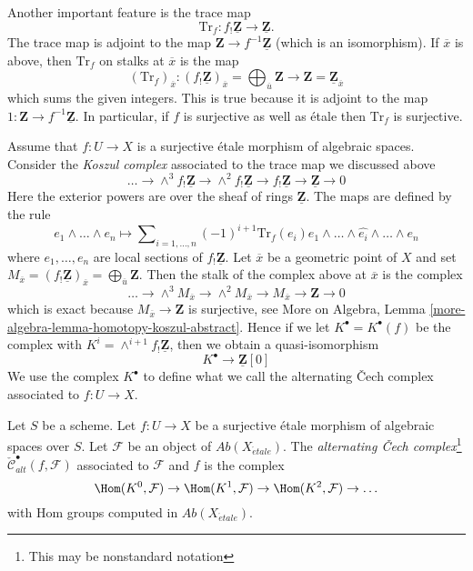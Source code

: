 \noindent
Another important feature is the trace map
$$
\text{Tr}_f : f_!\underline{\mathbf{Z}} \longrightarrow \underline{\mathbf{Z}}.
$$
The trace map is adjoint to the
map $\mathbf{Z} \to f^{-1}\underline{\mathbf{Z}}$ (which is an isomorphism).
If $\overline{x}$ is above, then $\text{Tr}_f$ on stalks at $\overline{x}$
is the map
$$
(\text{Tr}_f)_{\overline{x}} :
(f_!\underline{\mathbf{Z}})_{\overline{x}} =
\bigoplus\nolimits_{\overline{u}} \mathbf{Z}
\longrightarrow
\mathbf{Z} = \underline{\mathbf{Z}}_{\overline{x}}
$$
which sums the given integers. This is true because it is adjoint to the map
$1 : \mathbf{Z} \to f^{-1}\underline{\mathbf{Z}}$. In particular, if
$f$ is surjective as well as \'etale then $\text{Tr}_f$ is surjective.

\medskip\noindent
Assume that $f : U \to X$ is a surjective \'etale
morphism of algebraic spaces. Consider the {\it Koszul complex}
associated to the trace map we discussed above
$$
\ldots \to \wedge^3f_!\underline{\mathbf{Z}} \to
\wedge^2f_!\underline{\mathbf{Z}} \to f_!\underline{\mathbf{Z}} \to
\underline{\mathbf{Z}} \to 0
$$
Here the exterior powers are over the sheaf of rings $\underline{\mathbf{Z}}$.
The maps are defined by the rule
$$
e_1 \wedge \ldots \wedge e_n \longmapsto
\sum\nolimits_{i = 1, \ldots, n} (-1)^{i + 1}
\text{Tr}_f(e_i)
e_1 \wedge \ldots \wedge \widehat{e_i} \wedge \ldots \wedge e_n
$$
where $e_1, \ldots, e_n$ are local sections of $f_!\underline{\mathbf{Z}}$.
Let $\overline{x}$ be a geometric point of $X$ and set
$M_{\overline{x}} = (f_!\underline{\mathbf{Z}})_{\overline{x}} =
\bigoplus_{\overline{u}} \mathbf{Z}$. Then the stalk of the complex above at
$\overline{x}$ is the complex
$$
\ldots \to \wedge^3 M_{\overline{x}} \to \wedge^2 M_{\overline{x}}
\to M_{\overline{x}} \to \mathbf{Z} \to 0
$$
which is exact because $M_{\overline{x}} \to \mathbf{Z}$ is surjective, see
More on Algebra, Lemma \ref{more-algebra-lemma-homotopy-koszul-abstract}.
Hence if we let $K^\bullet = K^\bullet(f)$ be the complex with
$K^i = \wedge^{i + 1}f_!\underline{\mathbf{Z}}$, then we obtain a
quasi-isomorphism
\begin{equation}
\label{equation-quasi-isomorphism}
K^\bullet \longrightarrow \underline{\mathbf{Z}}[0]
\end{equation}
We use the complex $K^\bullet$ to define what we call
the alternating {\v C}ech complex associated to $f : U \to X$.

\begin{definition}
\label{definition-alternating-cech-complex}
Let $S$ be a scheme. Let $f : U \to X$ be a surjective \'etale morphism
of algebraic spaces over $S$. Let $\mathcal{F}$ be an object of
$\textit{Ab}(X_{\acute{e}tale})$. The
{\it alternating {\v C}ech complex}\footnote{This may be nonstandard notation}
$\check{\mathcal{C}}^\bullet_{alt}(f, \mathcal{F})$
associated to $\mathcal{F}$ and $f$ is the complex
$$
\Hom(K^0, \mathcal{F}) \to \Hom(K^1, \mathcal{F}) \to
\Hom(K^2, \mathcal{F}) \to \ldots
$$
with Hom groups computed in $\textit{Ab}(X_{\acute{e}tale})$.
\end{definition}

